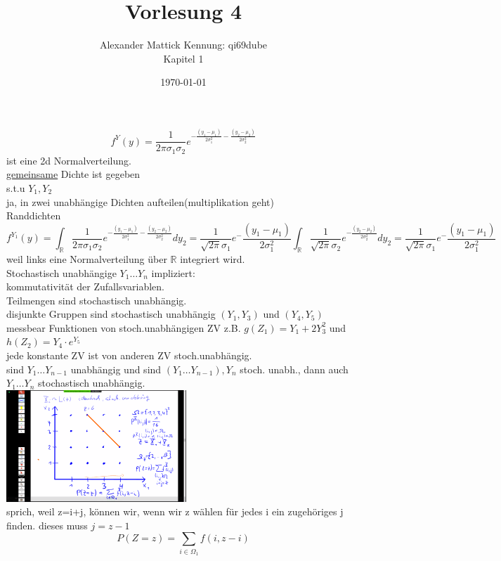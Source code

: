 \documentclass{article}
\author{
Alexander Mattick Kennung: qi69dube\\
Kapitel 1
}
\date{\today}
\title{Vorlesung 4}
\begin{document}
	\maketitle
	\[f^Y(y)=\frac{1}{2\pi\sigma_1\sigma_2}e^{-\frac{(y_1-\mu_1)}{2\sigma_1^2}-\frac{(y_2-\mu_2)}{2\sigma_2^2}}\]
	ist eine 2d Normalverteilung.\\
	\underline{gemeinsame} Dichte ist gegeben\\
	s.t.u $Y_1,Y_2$\\
	ja, in zwei unabhängige Dichten aufteilen(multiplikation geht)\\
	Randdichten\\
	\[f^{Y_1}(y)=\int_\mathbb{R}\frac{1}{2\pi\sigma_1\sigma_2}e^{-\frac{(y_1-\mu_1)}{2\sigma_1^2}-\frac{(y_2-\mu_2)}{2\sigma_2^2}} dy_2 = \frac{1}{\sqrt{2\pi}\sigma_1}e^-\frac{(y_1-\mu_1)}{2\sigma_1^2}\int_\mathbb{R}\frac{1}{\sqrt{2\pi}\sigma_2}e^{-\frac{(y_2-\mu_2)}{2\sigma_2^2}} dy_2 = \frac{1}{\sqrt{2\pi}\sigma_1}e^-\frac{(y_1-\mu_1)}{2\sigma_1^2}\]
	weil links eine Normalverteilung über $\mathbb{R}$ integriert wird.\\
	Stochastisch unabhängige $Y_1\dots Y_n$ impliziert:\\
	kommutativität der Zufallsvariablen.\\
	Teilmengen sind stochastisch unabhängig.\\
	disjunkte Gruppen sind stochastisch unabhängig $(Y_1,Y_3)$ und $(Y_4,Y_5)$\\
	messbear Funktionen von stoch.unabhängigen ZV z.B. $g(Z_1)=Y_1+2Y_3^2$ und $h(Z_2)=Y_4\cdot e^{Y_5}$\\
	jede konstante ZV ist von anderen ZV stoch.unabhängig.\\
	sind $Y_1\dots Y_{n-1}$ unabhängig und sind $(Y_1\dots Y_{n-1}), Y_n$ stoch. unabh., dann auch $Y_1\dots Y_n$ stochastisch unabhängig.\\
	\includegraphics[width=256px]{laplaceIID.png}\\
	sprich, weil z=i+j, können wir, wenn wir z wählen für jedes i ein zugehöriges j finden.
	dieses muss $j=z-1$\\
	\[P(Z=z) =\sum_{i\in\Omega_1} f(i,z-i)\]
\end{document}
